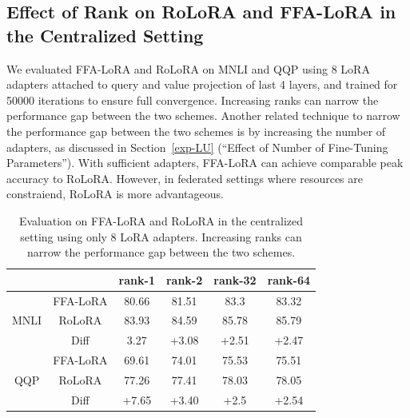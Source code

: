 \documentclass{article}
\theoremstyle{plain}
\theoremstyle{definition}
\theoremstyle{remark}
\begin{document}
 \subsection{Effect of Rank on RoLoRA and FFA-LoRA in the Centralized Setting} 
We evaluated FFA-LoRA and RoLoRA on MNLI and QQP using 8 LoRA adapters attached to query and value projection of last 4 layers, and trained for 50000 iterations to ensure full convergence. Increasing ranks can narrow the performance gap between the two schemes. Another related technique to narrow the performance gap between the two schemes is by increasing the number of adapters, as discussed in Section~\ref{exp-LU} (“Effect of Number of Fine-Tuning Parameters”). With sufficient adapters, FFA-LoRA can achieve comparable peak accuracy to RoLoRA. However, in federated settings where resources are constraiend, RoLoRA is more advantageous.
\begin{table}[h]
    \centering
    {\footnotesize
    \begin{tabular}{cccccc}
    \toprule
         &  & rank-1 & rank-2  & rank-32 & rank-64 \\
         \midrule
         & FFA-LoRA & 80.66 & 81.51 & 83.3 & 83.32 \\
        MNLI & RoLoRA & 83.93 & 84.59 & 85.78 & 85.79\\
         & Diff & 3.27 & +3.08 & +2.51 & +2.47\\
         \midrule
         & FFA-LoRA  & 69.61 & 74.01 & 75.53 & 75.51 \\
        QQP & RoLoRA & 77.26 & 77.41 & 78.03 & 78.05 \\
         & Diff & +7.65  &+3.40  & +2.5 & +2.54 \\
         \bottomrule
    \end{tabular}}
    \vspace{4pt}
    \caption{Evaluation on FFA-LoRA and RoLoRA in the centralized setting using only 8 LoRA adapters. Increasing ranks can narrow the performance gap between the two schemes. }
    \label{tab:centralized-rank}
\end{table}
 
\end{document}
